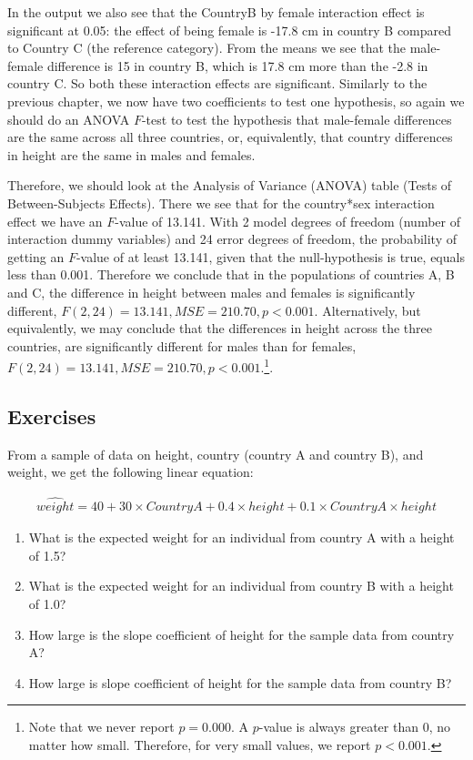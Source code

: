 \documentclass[]{book}\usepackage[]{graphicx}\usepackage[]{color}
\begin{document}
In the output we also see that the CountryB by female interaction effect is significant at 0.05: the effect of being female is -17.8 cm in country B compared to Country C (the reference category). From the means we see that the male-female difference is 15 in country B, which is 17.8 cm more than the -2.8 in country C. So both these interaction effects are significant. Similarly to the previous chapter, we now have two coefficients to test one hypothesis, so again we should do an ANOVA $F$-test to test the hypothesis that male-female differences are the same across all three countries, or, equivalently, that country differences in height are the same in males and females.


Therefore, we should look at the Analysis of Variance (ANOVA) table (Tests of Between-Subjects Effects). There we see that for the country*sex interaction effect we have an $F$-value of 13.141. With 2 model degrees of freedom (number of interaction dummy variables) and 24 error degrees of freedom, the probability of getting an $F$-value of at least 13.141, given that the null-hypothesis is true, equals less than 0.001. Therefore we conclude that in the populations of countries A, B and C, the difference in height between males and females is significantly different, $F(2, 24)=13.141, MSE=210.70, p < 0.001$. Alternatively, but equivalently, we may conclude that the differences in height across the three countries, are significantly different for males than for females, $F(2, 24)=13.141, MSE=210.70, p < 0.001$.\footnote{Note that we never report $p=0.000$. A $p$-value is always greater than 0, no matter how small. Therefore, for very small values, we report $p < 0.001$.}. 



\subsection{Exercises}

From a sample of data on height, country (country A and country B), and weight, we get the following linear equation:


\begin{eqnarray}
\widehat{weight}= 40 + 30 \times CountryA + 0.4\times height + 0.1 \times CountryA\times height \nonumber
\end{eqnarray}

\begin{enumerate}
\item What is the expected weight for an individual from country A with a height of 1.5?\\
\item What is the expected weight for an individual from country B with a height of 1.0?\\
\item How large is the slope coefficient of height for the sample data from country A? \\
\item How large is slope coefficient of height for the sample data from country B?\\
\end{enumerate}
\end{document}
